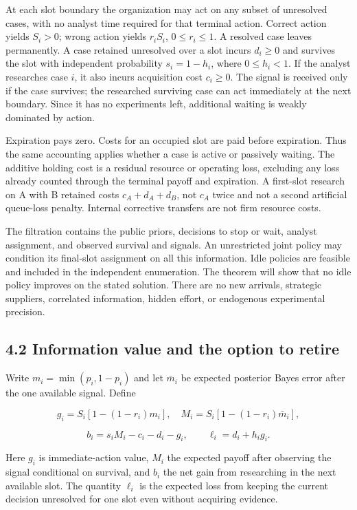 \documentclass[
  11pt,
]{article}
\begin{document}
At each slot boundary the organization may act on any subset of
unresolved cases, with no analyst time required for that terminal
action. Correct action yields \(S_i>0\); wrong action yields \(r_iS_i\),
\(0\leq r_i\leq1\). A resolved case leaves permanently. A case retained
unresolved over a slot incurs \(d_i\geq0\) and survives the slot with
independent probability \(s_i=1-h_i\), where \(0\leq h_i<1\). If the
analyst researches case \(i\), it also incurs acquisition cost
\(c_i\geq0\). The signal is received only if the case survives; the
researched surviving case can act immediately at the next boundary.
Since it has no experiments left, additional waiting is weakly dominated
by action.

Expiration pays zero. Costs for an occupied slot are paid before
expiration. Thus the same accounting applies whether a case is active or
passively waiting. The additive holding cost is a residual resource or
operating loss, excluding any loss already counted through the terminal
payoff and expiration. A first-slot research on A with B retained costs
\(c_A+d_A+d_B\), not \(c_A\) twice and not a second artificial
queue-loss penalty. Internal corrective transfers are not firm resource
costs.

The filtration contains the public priors, decisions to stop or wait,
analyst assignment, and observed survival and signals. An unrestricted
joint policy may condition its final-slot assignment on all this
information. Idle policies are feasible and included in the independent
enumeration. The theorem will show that no idle policy improves on the
stated solution. There are no new arrivals, strategic suppliers,
correlated information, hidden effort, or endogenous experimental
precision.

\subsection{4.2 Information value and the option to
retire}\label{information-value-and-the-option-to-retire}

Write \(m_i=\min(p_i,1-p_i)\) and let \(\bar m_i\) be expected posterior
Bayes error after the one available signal. Define

\[g_i=S_i[1-(1-r_i)m_i],\quad
M_i=S_i[1-(1-r_i)\bar m_i],\]

\[b_i=s_iM_i-c_i-d_i-g_i,\qquad
\ell_i=d_i+h_ig_i. \tag{1}\]

Here \(g_i\) is immediate-action value, \(M_i\) the expected payoff
after observing the signal conditional on survival, and \(b_i\) the net
gain from researching in the next available slot. The quantity
\(\ell_i\) is the expected loss from keeping the current decision
unresolved for one slot even without acquiring evidence.
\end{document}

